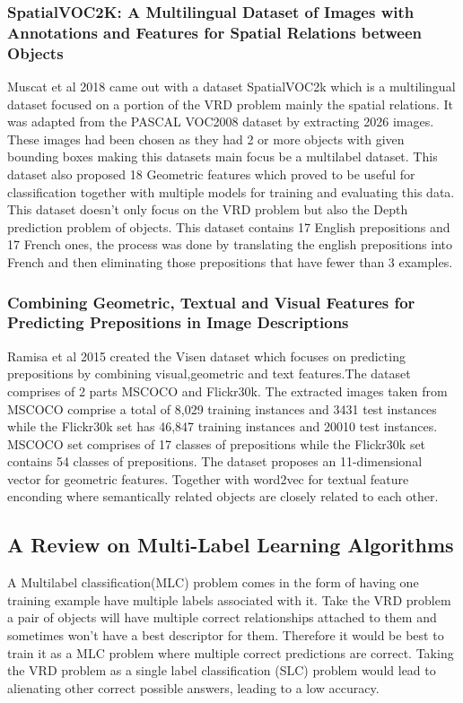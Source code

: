\documentclass{csfyp}
\begin{document}
\subsubsection{SpatialVOC2K: A Multilingual Dataset of Images with Annotations and Features for Spatial Relations between Objects}
Muscat et al 2018 came out with a dataset SpatialVOC2k which is a multilingual dataset focused on a portion of the VRD problem mainly the spatial relations. It was adapted from the PASCAL VOC2008 dataset by extracting 2026 images. These images had been chosen as they had 2 or more objects with given bounding boxes making this datasets main focus be a multilabel dataset. This dataset also proposed 18 Geometric features which proved to be useful for classification together with multiple models for training and evaluating this data. This dataset doesn’t only focus on the VRD problem but also the Depth prediction problem of objects. This dataset contains 17 English prepositions and 17 French ones, the process was done by translating the english prepositions into French and then eliminating those prepositions that have fewer than 3 examples. 

\subsubsection{Combining Geometric, Textual and Visual Features for Predicting Prepositions in Image Descriptions}
Ramisa et al 2015 created the Visen dataset which focuses on predicting prepositions by combining visual,geometric and text features.The dataset comprises of 2 parts MSCOCO and Flickr30k. The extracted images taken from MSCOCO comprise a total of 8,029 training instances and 3431 test instances while the Flickr30k set has 46,847 training instances and 20010 test instances. MSCOCO set comprises of 17 classes of prepositions while the Flickr30k set contains 54 classes of prepositions. The dataset proposes an 11-dimensional vector for geometric features. Together with word2vec for textual feature enconding where semantically related objects are closely related to each other.

\subsection{A Review on Multi-Label Learning Algorithms}
A Multilabel classification(MLC) problem comes in the form of having one training example have multiple labels associated with it. Take the VRD problem a pair of objects will have multiple correct relationships attached to them and sometimes won't have a best descriptor for them. Therefore it would be best to train it as a MLC problem where multiple correct predictions are correct. Taking the VRD problem as a single label classification (SLC) problem would lead to alienating other correct possible answers, leading to a low accuracy. 
\end{document}
